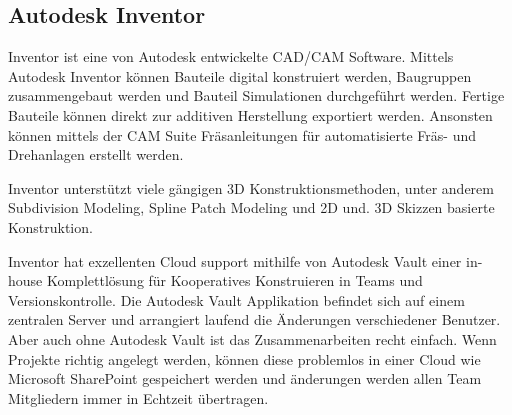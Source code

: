 \subsection{Autodesk Inventor}
\label{sec:inventor}

Inventor ist eine von Autodesk entwickelte CAD/CAM Software. Mittels Autodesk Inventor können Bauteile digital konstruiert werden, Baugruppen zusammengebaut werden und Bauteil Simulationen durchgeführt werden. Fertige Bauteile können direkt zur additiven Herstellung exportiert werden. Ansonsten können mittels der CAM Suite Fräsanleitungen für automatisierte Fräs- und Drehanlagen erstellt werden.

Inventor unterstützt viele gängigen 3D Konstruktionsmethoden, unter anderem Subdivision Modeling, Spline Patch Modeling und 2D und. 3D Skizzen basierte Konstruktion.

Inventor hat exzellenten Cloud support mithilfe von Autodesk Vault einer in-house Komplettlösung für Kooperatives Konstruieren in Teams und Versionskontrolle. Die Autodesk Vault Applikation befindet sich auf einem zentralen Server und arrangiert laufend die Änderungen verschiedener Benutzer. Aber auch ohne Autodesk Vault ist das Zusammenarbeiten recht einfach. Wenn Projekte richtig angelegt werden, können diese problemlos in einer Cloud wie Microsoft SharePoint gespeichert werden und änderungen werden allen Team Mitgliedern immer in Echtzeit übertragen.
